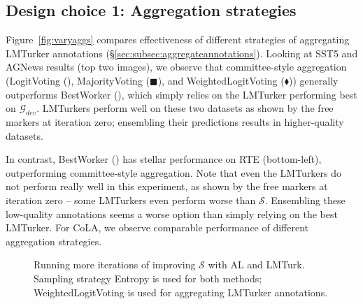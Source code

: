\documentclass[11pt]{article}
\def\md{LMTurk\xspace}
\def\mdr{LMTurker\xspace}
\def\mdrs{LMTurkers\xspace}
\def\figref#1{Figure~\ref{fig:#1}}
\def\figlabel#1{\label{fig:#1}\label{p:#1}}
\def\secref#1{\S\ref{sec:#1}}
\def\seclabel#1{\label{sec:#1}}
\begin{document}
\subsection{Design choice 1: Aggregation strategies}
\seclabel{varyaggregations}
\figref{varyaggs} compares effectiveness
of different strategies of
aggregating
\mdr annotations
(\secref{subsec:aggregateannotations}).
Looking at 
SST5 and AGNews results (top two images),
we observe that
committee-style aggregation
(LogitVoting (\tiny\XSolidBold\normalsize),
MajorityVoting (\tiny$\blacksquare$\normalsize),
and WeightedLogitVoting (\scriptsize$\blacklozenge$\normalsize))
generally outperforms
BestWorker (\scriptsize{}\normalsize), which
simply relies on
the
\mdr performing best on $\mathcal{G}_{dev}$.
\mdrs perform well
on these two datasets
as shown by the free markers
at iteration zero;
ensembling their
predictions results in
higher-quality datasets.

In contrast,
BestWorker (\scriptsize{}\normalsize)
has stellar performance
on RTE (bottom-left),
outperforming
committee-style aggregation.
Note that
even the \mdrs
do not perform
really well in this experiment, as shown
by the free markers at iteration zero --
some \mdrs even
perform worse than $\mathcal{S}$.
Ensembling these low-quality annotations
seems a worse option than simply
relying on the best \mdr.
For CoLA, we observe comparable
performance of different aggregation
strategies.


\begin{figure}[t]
\centering
{}
\vspace{-.15cm}
\caption{
  Running more iterations 
  of improving $\mathcal{S}$ with AL and \md.
  Sampling strategy Entropy is used for both methods;
  WeightedLogitVoting is used for aggregating
  \mdr annotations.
}
\figlabel{moreiters}
\end{figure}
\end{document}
